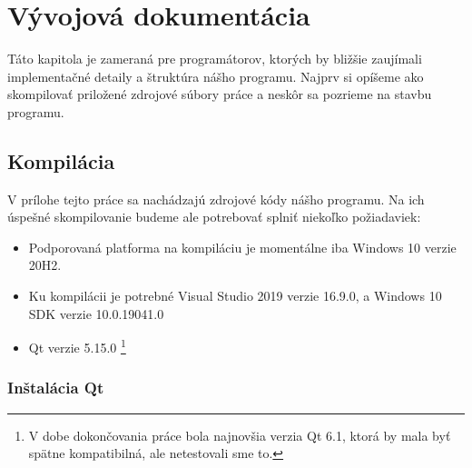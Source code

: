\chapter{Vývojová dokumentácia}
\label{chap:vyvoj_dok}

Táto kapitola je zameraná pre programátorov, ktorých by bližšie zaujímali implementačné detaily a štruktúra nášho programu. Najprv si opíšeme ako skompilovať priložené zdrojové súbory práce a neskôr sa pozrieme na stavbu programu.

\section{Kompilácia}
V prílohe tejto práce sa nachádzajú zdrojové kódy nášho programu. Na ich úspešné skompilovanie budeme ale potrebovať splniť niekoľko požiadaviek:
\begin{itemize}
\item Podporovaná platforma na kompiláciu je momentálne iba Windows 10 verzie 20H2.
\item Ku kompilácii je potrebné Visual Studio 2019 verzie 16.9.0, a Windows 10 SDK verzie 10.0.19041.0
\item Qt verzie 5.15.0 \footnote{V dobe dokončovania práce bola najnovšia verzia Qt 6.1, ktorá by mala byť spätne kompatibilná, ale netestovali sme to.}
\end{itemize}

\subsection{Inštalácia Qt}

